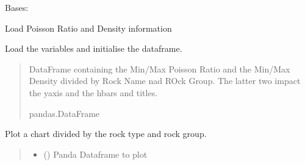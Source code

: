 \documentclass[letterpaper,10pt,english]{sphinxmanual}
\begin{document}
\begin{fulllineitems}
\label{\detokenize{pyrockmodulus:pyrockmodulus.pyrockmodulus.poisson_density}}
\pysigstartsignatures
{}
\pysigstopsignatures
\sphinxAtStartPar
Bases: 

\sphinxAtStartPar
Load Poisson Ratio and Density information

\begin{fulllineitems}
\label{\detokenize{pyrockmodulus:pyrockmodulus.pyrockmodulus.poisson_density.initial_processing}}
\pysigstartsignatures
{}
\pysigstopsignatures
\sphinxAtStartPar
Load the variables and initialise the dataframe.
\begin{quote}\begin{description}
\sphinxAtStartPar
DataFrame containing the Min/Max Poisson Ratio and the Min/Max Density divided by Rock Name nad ROck Group. The latter two impact the y\sphinxhyphen{}axis and the hbars and titles.

\sphinxAtStartPar
pandas.DataFrame

\end{description}\end{quote}

\end{fulllineitems}


\begin{fulllineitems}
\label{\detokenize{pyrockmodulus:pyrockmodulus.pyrockmodulus.poisson_density.plot_span_chart}}
\pysigstartsignatures
{}
\pysigstopsignatures
\sphinxAtStartPar
Plot a chart divided by the rock type and rock group.
\begin{quote}\begin{description}
\begin{itemize}
\item {} 
\sphinxAtStartPar
{} () \textendash{} Panda Dataframe to plot


\end{itemize}
\end{description}
\end{quote}
\end{fulllineitems}
\end{fulllineitems}
\end{document}
